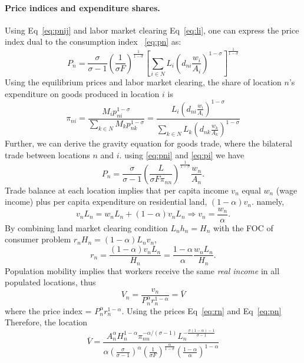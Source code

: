 \documentclass[11pt,a4paper]{article}
\begin{document}
\paragraph{Price indices and expenditure shares.} 
Using Eq~\eqref{eq:pnij} and labor market clearing Eq~\eqref{eq:li}, one can express the price index dual to the consumption index ~\eqref{eq:pn} as:
\begin{equation}
  P_n = \frac{\sigma }{\sigma -1} \left( \frac{1}{\sigma F} \right)^{\frac{1}{1-\sigma }} \left[ \sum_{i \in N}^{} L_i \left( d_{ni} \frac{w_i}{A_i} \right)^{1-\sigma } \right]^{\frac{1}{1-\sigma }}\label{eq:pni}
\end{equation}
Using the equilibrium prices and labor market clearing, the share of location $n$'s expenditure on goods produced in location $i$ is 
\begin{equation}
  \pi _{ni} = \frac{M_i p_{ni}^{1-\sigma }}{\sum_{k \in N}^{}M_k p_{nk}^{1-\sigma }} = \frac{L_i \left( d_{ni} \frac{w_i}{A_i} \right)^{1-\sigma }}{\sum_{k \in N}^{}L_k \left( d_{nk} \frac{w_k}{A_k} \right)^{1-\sigma }}\label{eq:pi}
\end{equation}
Further, we can derive the gravity equation for goods trade, where the bilateral trade between locations $n$ and $i$. 
using \eqref{eq:pni} and \eqref{eq:pi} we have 
\begin{equation}
  P_n = \frac{\sigma }{\sigma -1} \left( \frac{L}{\sigma F \pi _{nn}} \right)^{\frac{1}{1-\sigma }} \frac{w_n}{A_n}. \label{eq:pn}
\end{equation}
Trade balance at each location implies that per capita income $v_n$ equal $w_n$ (wage income) plus per capita expenditure on residential land, $(1-\alpha ) v_n$. namely,
\begin{equation}
  v_n L_n = w_n L_n + (1-\alpha ) v_n L_n \Rightarrow v_n 
   = \frac{w_n}{\alpha }. 
\end{equation}
By combining land market clearing condition $L_n h_n = H_n$ with the FOC of consumer problem $r_n H_n = (1-\alpha ) L_n v_n$, 
\begin{equation}
  r_n = \frac{(1-\alpha ) v_n L_n}{H_n} = \frac{1-\alpha }{\alpha } \frac{w_n L_n}{H_n}. \label{eq:rn}
\end{equation}
Population mobility implies that workers receive the same \textit{real income} in all populated locations, thus 
\begin{equation}
  V_n = \frac{v_n}{P_n^\alpha r_n^{1-\alpha }} = \bar{V}
\end{equation}
where the price index = $P_n^\alpha r_n^{1-\alpha }$. 
Using the prices Eq~\eqref{eq:rn} and Eq~\eqref{eq:pn}
Therefore, the location 
\begin{equation}
  \bar{V} = \frac{A_n^\alpha H_n^{1-\alpha } \pi _{nn}^{-\alpha /(\sigma -1)} L_n^{- \frac{\sigma (1-\alpha )-1}{\sigma -1}}}{\alpha \left( \frac{\sigma }{\sigma -1} \right)^{\alpha } \left( \frac{1}{\sigma F} \right)^{\frac{\alpha }{1-\sigma }}\left( \frac{1-\alpha }{\alpha } \right)^{1-\alpha }}
\end{equation}
\end{document}
